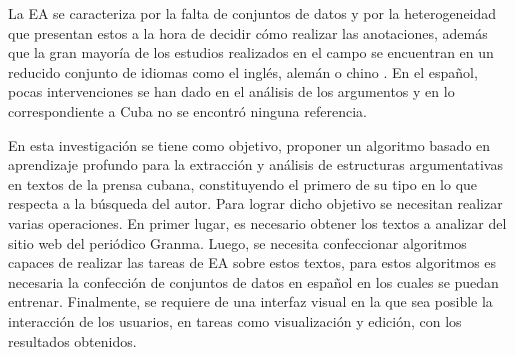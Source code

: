\documentclass[a4paper,11pt,twocolumn,twoside]{article}
\begin{document}
La EA se caracteriza por la falta de conjuntos de datos y 
por la heterogeneidad que presentan estos a la hora de decidir cómo realizar las 
anotaciones, además que la gran mayoría de los estudios realizados en el campo se encuentran en 
un reducido conjunto de idiomas como el inglés, alemán o chino \cite{eger2018cross}. 
En el español, pocas intervenciones se han dado en el análisis de los argumentos \cite{esteve2020mineria} y en 
lo correspondiente a Cuba no se encontró ninguna referencia. 



En esta investigación se tiene como objetivo, proponer un algoritmo basado en aprendizaje profundo 
para la extracción y análisis de estructuras argumentativas en textos 
de la prensa cubana, constituyendo el primero de su tipo en lo que respecta a la búsqueda del autor. 
Para lograr dicho objetivo se necesitan realizar varias operaciones.
En primer lugar, es necesario obtener los textos a analizar del sitio 
web del periódico Granma. Luego, se necesita confeccionar algoritmos capaces de realizar las tareas 
de EA sobre estos textos, para estos algoritmos es necesaria la confección de conjuntos 
de datos en español en los cuales se puedan entrenar. Finalmente, se requiere de una interfaz visual 
en la que sea posible la interacción de los usuarios, en tareas como visualización y edición, 
con los resultados obtenidos. 
\end{document}
